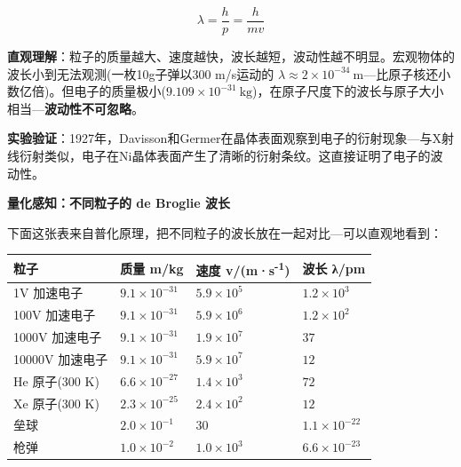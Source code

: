 \documentclass[a4paper,11pt]{ctexart}
\newcounter{none}
\newcommand{\箭}{\ensuremath{\rightarrow}}
\newcommand{\左箭}{\ensuremath{\leftarrow}}
\newcommand{\上箭}{\ensuremath{\uparrow}}
\newcommand{\下箭}{\ensuremath{\downarrow}}
\newcommand{\衡}{\ensuremath{\rightleftharpoons}}
\newcommand{\双箭}{\ensuremath{\leftrightarrow}}
\newcommand{\约等于}{\ensuremath{\approx}}
\newcommand{\小于等于}{\ensuremath{\leq}}
\newcommand{\大于等于}{\ensuremath{\geq}}
\newcommand{\不等于}{\ensuremath{\neq}}
\newcommand{\西格马}{\ensuremath{\sigma}}
\newcommand{\派}{\ensuremath{\pi}}
\begin{document}
\[\lambda = \frac{h}{p} = \frac{h}{mv}\]

\textbf{直观理解}：粒子的质量越大、速度越快，波长越短，波动性越不明显。宏观物体的波长小到无法观测(一枚10g子弹以300 m/s运动的 \(\lambda \approx 2\times 10^{-34}\ \mathrm{m}\)---比原子核还小数亿倍)。但电子的质量极小(\(9.109\times 10^{-31}\ \mathrm{kg}\))，在原子尺度下的波长与原子大小相当---\textbf{波动性不可忽略}。

\textbf{实验验证}：1927年，Davisson和Germer在晶体表面观察到电子的衍射现象---与X射线衍射类似，电子在Ni晶体表面产生了清晰的衍射条纹。这直接证明了电子的波动性。

\textbf{量化感知：不同粒子的 de Broglie 波长}

下面这张表来自普化原理，把不同粒子的波长放在一起对比---可以直观地看到：

{\def\LTcaptype{none} %
\begin{longtable}[]{@{}
  >{\raggedright\arraybackslash}p{}
  >{\raggedleft\arraybackslash}p{}
  >{\centering\arraybackslash}p{}
  >{\centering\arraybackslash}p{}@{}}
\toprule\noalign{}
\begin{minipage}[b]{\linewidth}\raggedright
粒子
\end{minipage} & \begin{minipage}[b]{\linewidth}\raggedleft
质量 m/kg
\end{minipage} & \begin{minipage}[b]{\linewidth}\centering
速度 v/(m·s\textsuperscript{-1})
\end{minipage} & \begin{minipage}[b]{\linewidth}\centering
波长 λ/pm
\end{minipage} \\
\midrule\noalign{}
\endhead
\bottomrule\noalign{}
\endlastfoot
1V 加速电子 & \(9.1\times 10^{-31}\) & \(5.9\times 10^5\) & \(1.2\times 10^{3}\) \\
100V 加速电子 & \(9.1\times 10^{-31}\) & \(5.9\times 10^6\) & \(1.2\times 10^{2}\) \\
1000V 加速电子 & \(9.1\times 10^{-31}\) & \(1.9\times 10^7\) & \(37\) \\
10000V 加速电子 & \(9.1\times 10^{-31}\) & \(5.9\times 10^7\) & \(12\) \\
He 原子(300 K) & \(6.6\times 10^{-27}\) & \(1.4\times 10^3\) & \(72\) \\
Xe 原子(300 K) & \(2.3\times 10^{-25}\) & \(2.4\times 10^2\) & \(12\) \\
垒球 & \(2.0\times 10^{-1}\) & \(30\) & \(1.1\times 10^{-22}\) \\
枪弹 & \(1.0\times 10^{-2}\) & \(1.0\times 10^3\) & \(6.6\times 10^{-23}\) \\
\end{longtable}
}
\end{document}
